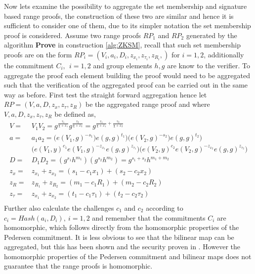 Now lets examine the possibility to aggregate the set membership and signature based range proofs, the construction of these two are similar and hence it is sufficient to consider one of them, due to  its simpler notation the set membership proof is considered. Assume two range proofs $RP_1$ and $RP_2$ generated by the algorithm \textbf{Prove} in construction \ref{alg:ZKSM}, recall that such set membership proofs are on the form $RP_i = (V_i,a_i,D_i,z_{x_i},z_{\tau _i},z_{R_i}, )$ for $i=1,2$,  additionally the commitment $C_i, \:\: i=1,2$ and group elements $h,g$ are know to the verifier. To aggregate the proof each element building the proof would need to be aggregated such that the verification of the aggregated proof can be carried out in the same way as before. First test the straight forward aggregation hence let $RP = (V,a,D,z_{x},z_{\tau },z_{R})$ be the aggregated range proof and  where $V, a, D,z_{x},z_{\tau },z_{R}$ be defined as,
\begin{equation}
\begin{aligned}
\label{eq:naiveAgg}
V =& V_1V_2 = g^{\frac{\tau_1}{\chi + x_1}}g^{\frac{\tau_2}{\chi + x_2}}  = g^{\frac{\tau_1}{\chi + x_1} + \frac{\tau_2}{\chi + x_2}}  \\
a =& a_1a_2 = \big(e(V_1,g)^{-s_1})e(g,g)^{t_1}\big)  \big(e(V_2,g)^{-s_2})e(g,g)^{t_2}\big) \\
& \big(e(V_1,y)^{c_1}e(V_1,g)^{-z_{x_1}}e(g,g)^{z_{\tau_1}} \big )   \big(e(V_2,y)^{c_2}e(V_2,g)^{-z_{x_2}}e(g,g)^{z_{\tau_2}} \big ) \\
D =& D_1D_2 = ( g^{s_1}h^{m_1} ) (g^{s_2} h^{m_2}) = g^{s_1+s_2}h^{m_1+m_2}\\
z_x =& z_{x_1} + z_{x_2} = (s_1-c_1x_1)+(s_2-c_2x_2)\\
z_R =& z_{R_1} + z_{R_2} = (m_1-c_1R_1)+(m_2-c_2R_2)\\
z_\tau =& z_{x_1} + z_{x_2} = (t_1-c_1\tau_1)+(t_2-c_2\tau_2)\\ 
\end{aligned} 
\end{equation}
Further also calculate the challenges $c_1$ and $c_2$ according to $c_i=Hash(a_i,D_i),\: i=1,2$ and remember that the  commitments $C_i$  are homomorphic, which  follows directly from the homomorphic properties of the Pedersen commitment. It is less obvious to see that the bilinear map can be aggregated, but this has been shown and the security proven in \cite{aggregate_bm}. However the homomorphic properties of the Pedersen commitment and bilinear maps does not guarantee that the range proofs is homomorphic. 


